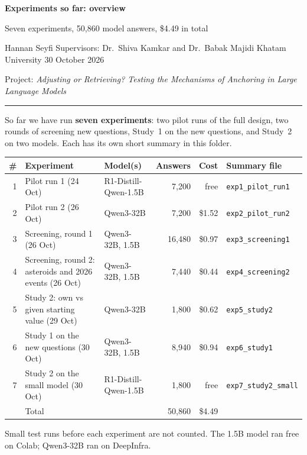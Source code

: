 \documentclass[11pt,a4paper]{article}
\newcommand{\header}[3]{%
  {\Large\textbf{#1}}\par\smallskip
  {\large #2}\par\smallskip
  {\small Hannan Seyfi \textperiodcentered{} Supervisors: Dr.\ Shiva Kamkar and Dr.\ Babak Majidi \textperiodcentered{} Khatam University \textperiodcentered{} #3}\par
  {\small Project: \emph{Adjusting or Retrieving? Testing the Mechanisms of Anchoring in Large Language Models}}\par\medskip\hrule\medskip}
\begin{document}
\header{Experiments so far: overview}{Seven experiments, 50,860 model answers, \$4.49 in total}{30 October 2026}

So far we have run \textbf{seven experiments}: two pilot runs of the full design, two rounds of screening new questions, Study~1 on the new questions, and Study~2 on two models. Each has its own short summary in this folder.

\begin{center}\small
\begin{tabular}{@{}rp{4.3cm}p{3.1cm}rrl@{}}
\toprule
\# & Experiment & Model(s) & Answers & Cost & Summary file \\
\midrule
1 & Pilot run 1 (24 Oct) & R1-Distill-Qwen-1.5B & 7,200 & free & \texttt{exp1\_pilot\_run1} \\
2 & Pilot run 2 (26 Oct) & Qwen3-32B & 7,200 & \$1.52 & \texttt{exp2\_pilot\_run2} \\
3 & Screening, round 1 (26 Oct) & Qwen3-32B, 1.5B & 16,480 & \$0.97 & \texttt{exp3\_screening1} \\
4 & Screening, round 2: asteroids and 2026 events (26 Oct) & Qwen3-32B, 1.5B & 7,440 & \$0.44 & \texttt{exp4\_screening2} \\
5 & Study 2: own vs given starting value (29 Oct) & Qwen3-32B & 1,800 & \$0.62 & \texttt{exp5\_study2} \\
6 & Study 1 on the new questions (30 Oct) & Qwen3-32B, 1.5B & 8,940 & \$0.94 & \texttt{exp6\_study1} \\
7 & Study 2 on the small model (30 Oct) & R1-Distill-Qwen-1.5B & 1,800 & free & \texttt{exp7\_study2\_small} \\
\midrule
 & Total & & 50,860 & \$4.49 & \\
\bottomrule
\end{tabular}
\end{center}
{\small Small test runs before each experiment are not counted. The 1.5B model ran free on Colab; Qwen3-32B ran on DeepInfra.}
\end{document}
